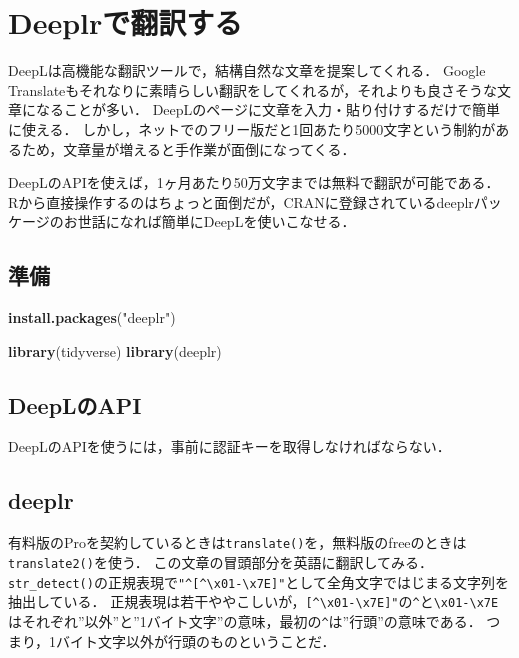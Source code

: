 \documentclass[
]{article}
\newenvironment{Shaded}{\begin{snugshade}}{\end{snugshade}}
\newcommand{\FunctionTok}[1]{\textcolor[rgb]{0.13,0.29,0.53}{\textbf{#1}}}
\newcommand{\NormalTok}[1]{#1}
\newcommand{\StringTok}[1]{\textcolor[rgb]{0.31,0.60,0.02}{#1}}
\begin{document}
\hypertarget{deeplr}{%
\section{Deeplrで翻訳する}\label{deeplr}}

DeepLは高機能な翻訳ツールで，結構自然な文章を提案してくれる．
Google Translateもそれなりに素晴らしい翻訳をしてくれるが，それよりも良さそうな文章になることが多い．
DeepLのページに文章を入力・貼り付けするだけで簡単に使える．
しかし，ネットでのフリー版だと1回あたり5000文字という制約があるため，文章量が増えると手作業が面倒になってくる．

DeepLのAPIを使えば，1ヶ月あたり50万文字までは無料で翻訳が可能である．
Rから直接操作するのはちょっと面倒だが，CRANに登録されているdeeplrパッケージのお世話になれば簡単にDeepLを使いこなせる．

\hypertarget{ux6e96ux5099-6}{%
\subsection{準備}\label{ux6e96ux5099-6}}

\begin{Shaded}
\begin{Highlighting}[]
\FunctionTok{install.packages}\NormalTok{(}\StringTok{"deeplr"}\NormalTok{)}
\end{Highlighting}
\end{Shaded}

\begin{Shaded}
\begin{Highlighting}[]
\FunctionTok{library}\NormalTok{(tidyverse)}
\FunctionTok{library}\NormalTok{(deeplr)}
\end{Highlighting}
\end{Shaded}

\hypertarget{deeplux306eapi}{%
\subsection{DeepLのAPI}\label{deeplux306eapi}}

DeepLのAPIを使うには，事前に認証キーを取得しなければならない．

\hypertarget{deeplr-1}{%
\subsection{deeplr}\label{deeplr-1}}

有料版のProを契約しているときは\texttt{translate()}を，無料版のfreeのときは\texttt{translate2()}を使う．
この文章の冒頭部分を英語に翻訳してみる．
\texttt{str\_detect()}の正規表現で\texttt{"\^{}{[}\^{}\textbackslash{}x01-\textbackslash{}x7E{]}"}として全角文字ではじまる文字列を抽出している．
正規表現は若干ややこしいが，\texttt{{[}\^{}\textbackslash{}x01-\textbackslash{}x7E{]}"}の\texttt{\^{}}と\texttt{\textbackslash{}x01-\textbackslash{}x7E}はそれぞれ''以外''と''1バイト文字''の意味，最初の\texttt{\^{}}は''行頭''の意味である．
つまり，1バイト文字以外が行頭のものということだ．
\end{document}
